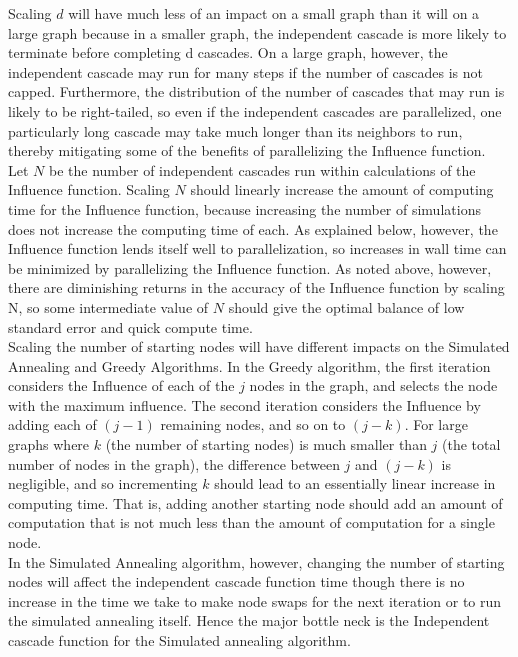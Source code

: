 \documentclass[11pt]{scrartcl} %
\begin{document}
Scaling $d$ will have much less of an impact on a small graph than it will on a large graph because in a smaller graph, the independent cascade is more likely to terminate before completing d cascades.  On a large graph, however, the independent cascade may run for many steps if the number of cascades is not capped.  Furthermore, the distribution of the number of cascades that may run is likely to be right-tailed, so even if the independent cascades are parallelized, one particularly long cascade may take much longer than its neighbors to run, thereby mitigating some of the benefits of parallelizing the Influence function.\\

Let $N$ be the number of independent cascades run within calculations of the Influence function. Scaling $N$ should linearly increase the amount of computing time for the Influence function, because increasing the number of simulations does not increase the computing time of each.  As explained below, however, the Influence function lends itself well to parallelization, so increases in wall time can be minimized by parallelizing the Influence function.  As noted above, however, there are diminishing returns in the accuracy of the Influence function by scaling N, so some intermediate value of $N$ should give the optimal balance of low standard error and quick compute time.\\

Scaling the number of starting nodes will have different impacts on the Simulated Annealing and Greedy Algorithms. In the Greedy algorithm, the first iteration considers the Influence of each of the $j$ nodes in the graph, and selects the node with the maximum influence.  The second iteration considers the Influence by adding each of $(j-1)$ remaining nodes, and so on to $(j-k)$.  For large graphs where $k$ (the number of starting nodes) is much smaller than $j$ (the total number of nodes in the graph), the difference between $j$ and $(j-k)$ is negligible, and so incrementing $k$ should lead to an essentially linear increase in computing time.  That is, adding another starting node should add an amount of computation that is not much less than the amount of computation for a single node.\\

In the Simulated Annealing algorithm, however, changing the number of starting nodes will affect the independent cascade function time though there is no increase in the time we take to make node swaps for the next iteration or to run the simulated annealing itself. Hence the major bottle neck is the Independent cascade function for the Simulated annealing algorithm. 
\end{document}

